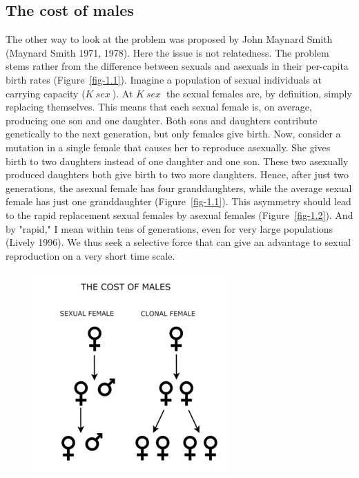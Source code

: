 \documentclass[
  letterpaper,
]{scrbook}
\begin{document}
\hypertarget{the-cost-of-males}{%
\subsection{The cost of males}\label{the-cost-of-males}}

The other way to look at the problem was proposed by John Maynard Smith
(Maynard Smith 1971, 1978). Here the issue is not relatedness. The
problem stems rather from the difference between sexuals and asexuals in
their per-capita birth rates (Figure~\ref{fig-1.1}). Imagine a
population of sexual individuals at carrying capacity (\(K~sex~\)). At
\(K~sex~\) the sexual females are, by definition, simply replacing
themselves. This means that each sexual female is, on average, producing
one son and one daughter. Both sons and daughters contribute genetically
to the next generation, but only females give birth. Now, consider a
mutation in a single female that causes her to reproduce asexually. She
gives birth to two daughters instead of one daughter and one son. These
two asexually produced daughters both give birth to two more daughters.
Hence, after just two generations, the asexual female has four
granddaughters, while the average sexual female has just one
granddaughter (Figure~\ref{fig-1.1}). This asymmetry should lead to the
rapid replacement sexual females by asexual females
(Figure~\ref{fig-1.2}). And by "rapid," I mean within tens of
generations, even for very large populations (Lively 1996). We thus seek
a selective force that can give an advantage to sexual reproduction on a
very short time scale.

\begin{figure}


{\centering \includegraphics{images/fig1-1.jpg}

}

\end{figure}
\end{document}
